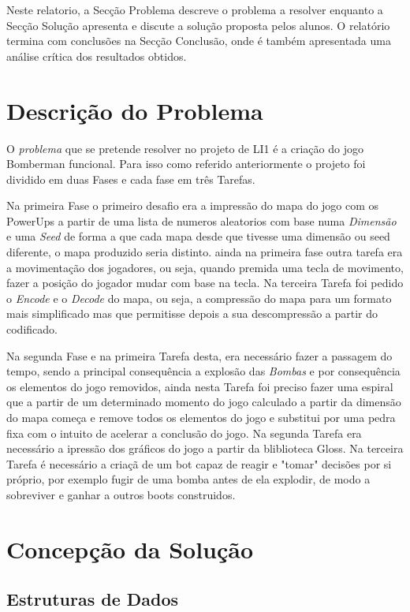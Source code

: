 \documentclass[a4paper]{article}
\begin{document}
Neste relatorio, a
Secção Problema descreve o problema a resolver enquanto a
Secção Solução apresenta e discute a solução proposta pelos
alunos. O relatório termina com conclusões na
Secção Conclusão, onde é também apresentada uma análise
crítica dos resultados obtidos.

\section{Descrição do Problema}
\label{sec:problema}

O \emph{problema} que se pretende resolver no projeto de LI1 é a criação
do jogo Bomberman funcional. Para isso como referido anteriormente o projeto foi 
dividido em duas Fases e cada fase em três Tarefas.

Na primeira Fase o primeiro desafio
era a impressão do mapa do jogo com os PowerUps a partir de uma lista de numeros aleatorios
com base numa \emph{Dimensão} e uma \emph{Seed} de forma a que cada mapa desde que tivesse uma
dimensão ou seed diferente, o mapa produzido seria distinto. ainda na primeira fase outra tarefa 
era a movimentação dos jogadores, ou seja, quando premida uma tecla de movimento, fazer a posição 
do jogador mudar com base na tecla. Na terceira Tarefa foi pedido o \emph{Encode} e o \emph{Decode}
do mapa, ou seja, a compressão do mapa para um formato mais simplificado mas que permitisse depois 
a sua descompressão a partir do codificado.

Na segunda Fase e na primeira Tarefa desta, era necessário fazer a passagem do tempo, sendo
a principal consequência a explosão das \emph{Bombas} e por consequência os elementos do jogo removidos,
ainda nesta Tarefa foi preciso fazer uma espiral que a partir de um determinado momento do jogo calculado 
a partir da dimensão do mapa começa e remove todos os elementos do jogo e substitui por uma pedra fixa 
com o intuito de acelerar a conclusão do jogo. Na segunda Tarefa era necessário a ipressão dos gráficos do
jogo a partir da bliblioteca Gloss. Na terceira Tarefa é necessário a criaçã de um bot capaz de reagir 
e "tomar" decisões por si próprio, por exemplo fugir de uma bomba antes de ela explodir, de modo a 
sobreviver e ganhar a outros boots construidos.


\section{Concepção da Solução}
\label{sec:solucao}


\subsection{Estruturas de Dados}
\end{document}
